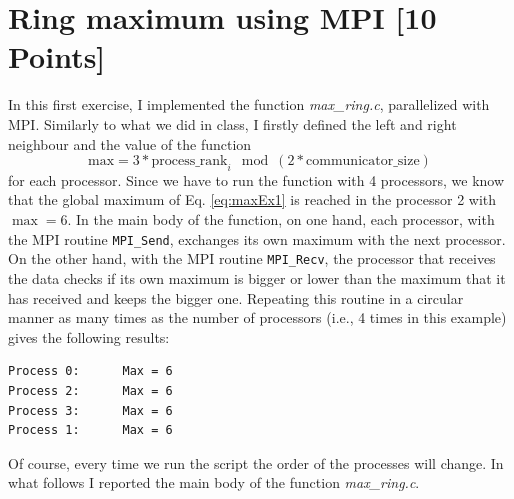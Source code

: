 \documentclass[unicode,11pt,a4paper,oneside,numbers=endperiod,openany]{scrartcl}
\begin{document}
\setassignment
{}

\newline

\assignmentpolicy

\section{Ring maximum using MPI [10 Points]}
In this first exercise, I implemented the function \textit{max\_ring.c}, parallelized with MPI. Similarly to what we did in class, I firstly defined the left and right neighbour and the value of the function  
\begin{equation}\label{eq:maxEx1}
	\text{max} = 3 * \text{process\_rank}_i \mod(2 * \text{communicator\_size}) 
\end{equation}
for each processor. Since we have to run the function with 4 processors, we know that the global maximum of Eq. \ref{eq:maxEx1} is reached in the processor 2 with $\max = 6$. In the main body of the function, on one hand, each processor, with the MPI routine \texttt{MPI\_Send}, exchanges its own maximum with the next processor. On the other hand, with the MPI routine \texttt{MPI\_Recv}, the processor that receives the data checks if its own maximum is bigger or lower than the maximum that it has received and keeps the bigger one. Repeating this routine in a circular manner as many times as the number of processors (i.e., 4 times in this example) gives the following results:

\begin{lstlisting}[language = bash, backgroundcolor=\color{gray!20}]
Process 0:		Max = 6
Process 2:		Max = 6
Process 3:		Max = 6
Process 1:		Max = 6
\end{lstlisting}
 Of course, every time we run the script the order of the processes will change. In what follows I reported the main body of the function \textit{max\_ring.c}.


\end{document}
